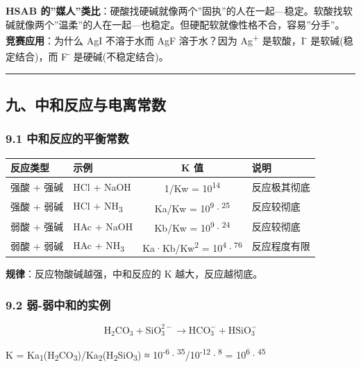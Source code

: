 \textbf{HSAB 的''媒人''类比}：硬酸找硬碱就像两个''固执''的人在一起---稳定。软酸找软碱就像两个''温柔''的人在一起---也稳定。但硬配软就像性格不合，容易''分手''。
\textbf{竞赛应用}：为什么 AgI 不溶于水而 AgF 溶于水？因为 Ag\textsuperscript{+} 是软酸，I\textsuperscript{-} 是软碱(稳定结合)，而 F\textsuperscript{-} 是硬碱(不稳定结合)。

\begin{center}\rule{0.5\linewidth}{0.5pt}\end{center}

\subsection{九、中和反应与电离常数}\label{ux4e5dux4e2dux548cux53cdux5e94ux4e0eux7535ux79bbux5e38ux6570}

\subsubsection{9.1 中和反应的平衡常数}\label{ux4e2dux548cux53cdux5e94ux7684ux5e73ux8861ux5e38ux6570}

{\def\LTcaptype{none} %
\begin{longtable}[]{@{}llcl@{}}
\toprule\noalign{}
反应类型 & 示例 & K 值 & 说明 \\
\midrule\noalign{}
\endhead
\bottomrule\noalign{}
\endlastfoot
强酸 + 强碱 & HCl + NaOH & 1/Kw = 10\textsuperscript{14} & 反应极其彻底 \\
强酸 + 弱碱 & HCl + NH\textsubscript{3} & Ka/Kw = 10\textsuperscript{9}·\textsuperscript{25} & 反应较彻底 \\
弱酸 + 强碱 & HAc + NaOH & Kb/Kw = 10\textsuperscript{9}·\textsuperscript{24} & 反应较彻底 \\
弱酸 + 弱碱 & HAc + NH\textsubscript{3} & Ka·Kb/Kw\textsuperscript{2} = 10\textsuperscript{4}·\textsuperscript{76} & 反应程度有限 \\
\end{longtable}
}

\textbf{规律}：反应物酸碱越强，中和反应的 K 越大，反应越彻底。

\subsubsection{9.2 弱-弱中和的实例}\label{ux5f31-ux5f31ux4e2dux548cux7684ux5b9eux4f8b}

\[
\mathrm{H_2CO_3 + SiO_3^{2-} \to HCO_3^- + HSiO_3^-}
\]

K = Ka\textsubscript{1}(H\textsubscript{2}CO\textsubscript{3})/Ka\textsubscript{2}(H\textsubscript{2}SiO\textsubscript{3}) ≈ 10\textsuperscript{-6}·\textsuperscript{35}/10\textsuperscript{-12}·\textsuperscript{8} = 10\textsuperscript{6}·\textsuperscript{45}

